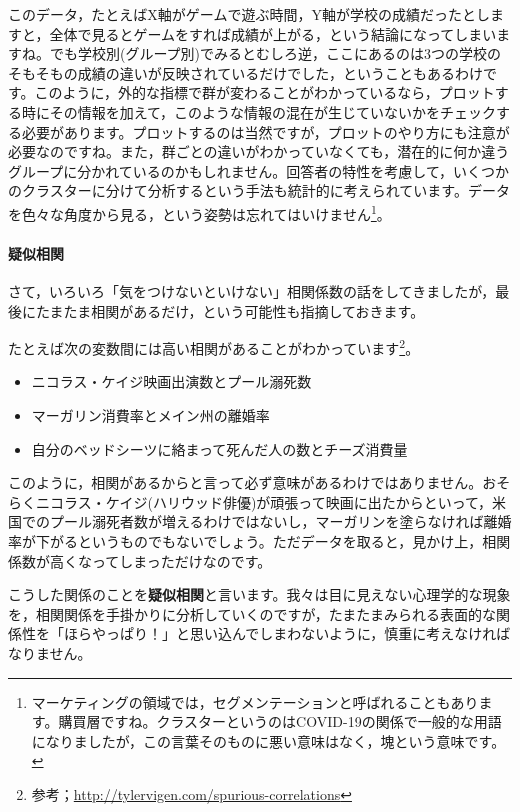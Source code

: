 \documentclass{ltjbook}
\begin{document}
このデータ，たとえばX軸がゲームで遊ぶ時間，Y軸が学校の成績だったとしますと，全体で見るとゲームをすれば成績が上がる，という結論になってしまいますね。でも学校別(グループ別)でみるとむしろ逆，ここにあるのは3つの学校のそもそもの成績の違いが反映されているだけでした，ということもあるわけです。このように，外的な指標で群が変わることがわかっているなら，プロットする時にその情報を加えて，このような情報の混在が生じていないかをチェックする必要があります。プロットするのは当然ですが，プロットのやり方にも注意が必要なのですね。また，群ごとの違いがわかっていなくても，潜在的に何か違うグループに分かれているのかもしれません。回答者の特性を考慮して，いくつかのクラスターに分けて分析するという手法も統計的に考えられています。データを色々な角度から見る，という姿勢は忘れてはいけません\footnote{マーケティングの領域では，セグメンテーションと呼ばれることもあります。購買層ですね。クラスターというのはCOVID-19の関係で一般的な用語になりましたが，この言葉そのものに悪い意味はなく，塊という意味です。}。

\paragraph{疑似相関}

さて，いろいろ「気をつけないといけない」相関係数の話をしてきましたが，最後にたまたま相関があるだけ，という可能性も指摘しておきます。

たとえば次の変数間には高い相関があることがわかっています\footnote{参考；\url{http://tylervigen.com/spurious-correlations}}。
\begin{itemize}
	\item ニコラス・ケイジ映画出演数とプール溺死数
	\item マーガリン消費率とメイン州の離婚率
	\item 自分のベッドシーツに絡まって死んだ人の数とチーズ消費量
\end{itemize}

このように，相関があるからと言って必ず意味があるわけではありません。おそらくニコラス・ケイジ(ハリウッド俳優)が頑張って映画に出たからといって，米国でのプール溺死者数が増えるわけではないし，マーガリンを塗らなければ離婚率が下がるというものでもないでしょう。ただデータを取ると，見かけ上，相関係数が高くなってしまっただけなのです。

こうした関係のことを\textbf{疑似相関}と言います。我々は目に見えない心理学的な現象を，相関関係を手掛かりに分析していくのですが，たまたまみられる表面的な関係性を「ほらやっぱり！」と思い込んでしまわないように，慎重に考えなければなりません。
\end{document}

